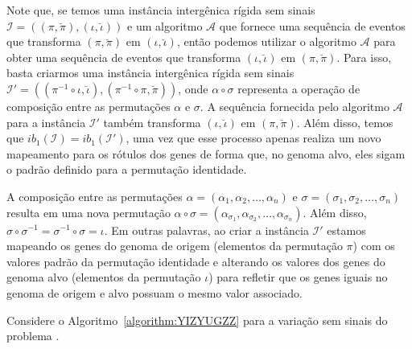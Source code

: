 \begin{remark}\label{remark:MSXQJZFR}
Note que, se temos uma instância intergênica rígida sem sinais $\mathcal{I}=((\pi,\breve\pi),(\iota,\breve\iota))$ e um algoritmo $\mathcal{A}$ que fornece uma sequência de eventos que transforma $(\pi,\breve\pi)$ em $(\iota,\breve\iota)$, então podemos utilizar o algoritmo $\mathcal{A}$ para obter uma sequência de eventos que transforma $(\iota,\breve\iota)$ em $(\pi,\breve\pi)$. Para isso, basta criarmos uma instância intergênica rígida sem sinais $\mathcal{I'}=((\pi^{-1} \circ \iota,\breve\iota),(\pi^{-1} \circ \pi,\breve\pi))$, onde $\alpha \circ \sigma$ representa a operação de composição entre as permutações $\alpha$ e $\sigma$. A sequência fornecida pelo algoritmo $\mathcal{A}$ para a instância $\mathcal{I'}$ também transforma $(\iota,\breve\iota)$ em $(\pi,\breve\pi)$. Além disso, temos que $ib_1(\mathcal{I}) = ib_1(\mathcal{I'})$, uma vez que esse processo apenas realiza um novo mapeamento para os rótulos dos genes de forma que, no genoma alvo, eles sigam o padrão definido para a permutação identidade.
\end{remark}

A composição entre as permutações $\alpha=(\alpha_1,\alpha_2,\dots,\alpha_n)$ e $\sigma=(\sigma_1,\sigma_2,\dots,\sigma_n)$ resulta em uma nova permutação $\alpha \circ \sigma = (\alpha_{\sigma_1},\alpha_{\sigma_2},\dots,\alpha_{\sigma_n})$. Além disso, $\sigma \circ \sigma^{-1} = \sigma^{-1} \circ \sigma = \iota$. Em outras palavras, ao criar a instância $\mathcal{I'}$ estamos mapeando os genes do genoma de origem (elementos da permutação $\pi$) com os valores padrão da permutação identidade e alterando os valores dos genes do genoma alvo (elementos da permutação $\iota$) para refletir que os genes iguais no genoma de origem e alvo possuam o mesmo valor associado.

Considere o Algoritmo~\ref{algorithm:YIZYUGZZ} para a variação sem sinais do problema \SbIRTI{}.



